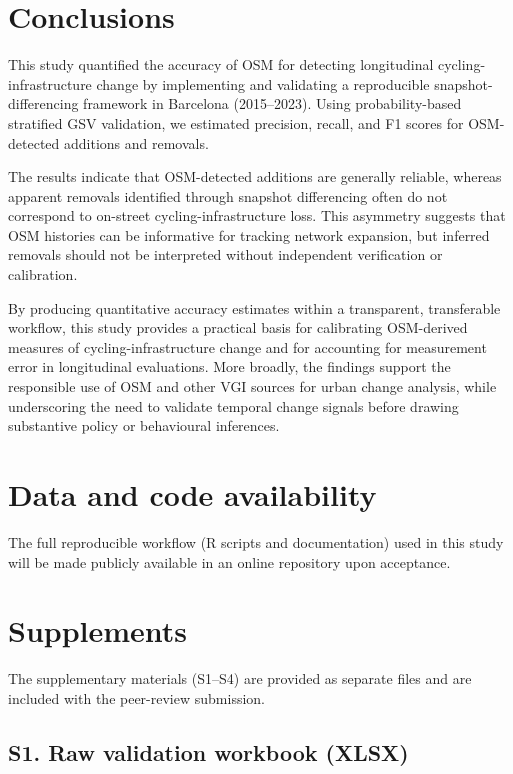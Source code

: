 \documentclass[
]{article}
\begin{document}
\section{Conclusions}\label{conclusions}

This study quantified the accuracy of OSM for detecting longitudinal
cycling-infrastructure change by implementing and validating a
reproducible snapshot-differencing framework in Barcelona (2015--2023).
Using probability-based stratified GSV validation, we estimated
precision, recall, and F1 scores for OSM-detected additions and
removals.

The results indicate that OSM-detected additions are generally reliable,
whereas apparent removals identified through snapshot differencing often
do not correspond to on-street cycling-infrastructure loss. This
asymmetry suggests that OSM histories can be informative for tracking
network expansion, but inferred removals should not be interpreted
without independent verification or calibration.

By producing quantitative accuracy estimates within a transparent,
transferable workflow, this study provides a practical basis for
calibrating OSM-derived measures of cycling-infrastructure change and
for accounting for measurement error in longitudinal evaluations. More
broadly, the findings support the responsible use of OSM and other VGI
sources for urban change analysis, while underscoring the need to
validate temporal change signals before drawing substantive policy or
behavioural inferences.

\section*{Data and code availability}\label{data-and-code-availability}

The full reproducible workflow (R scripts and documentation) used in
this study will be made publicly available in an online repository upon
acceptance.

\section*{Supplements}\label{supplements}

The supplementary materials (S1--S4) are provided as separate files and
are included with the peer-review submission.

\subsection*{S1. Raw validation workbook (XLSX)}\label{s1-workbook}
\end{document}
